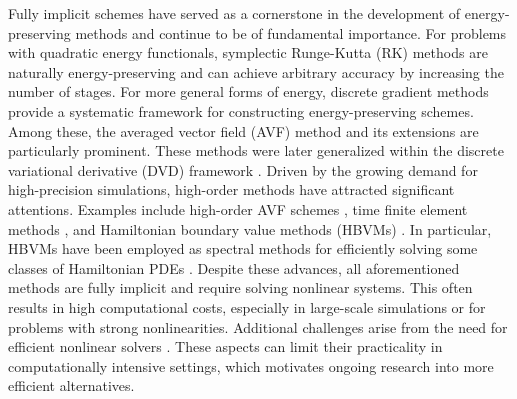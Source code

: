 \documentclass[onefignum,onetabnum]{siamart}
\begin{document}
Fully implicit schemes have served as a cornerstone in the development of energy-preserving methods and continue to be of fundamental importance. For problems with quadratic energy functionals, symplectic Runge-Kutta (RK) methods \cite{hairer-06-GNI-ODE} are naturally energy-preserving and can achieve arbitrary accuracy by increasing the number of stages. For more general forms of energy, discrete gradient methods \cite{mcLachlan-99-DG-PTRSLA} provide a systematic framework for constructing energy-preserving schemes. Among these, the averaged vector field (AVF) method \cite{quispel-08-AVF-JPAMT} and its extensions \cite{cai-18-PAVF-JCP,wu-13-oscil-JCP} are particularly prominent. These methods were later generalized within the discrete variational derivative (DVD) framework \cite{furihata-11-DVD-CHCRC}. Driven by the growing demand for high-precision simulations, high-order methods have attracted significant attentions. Examples include high-order AVF schemes \cite{hairer-10-coll-JNAIAM,Li-16-AVF-JCM}, time finite element methods \cite{betsch-00-time-FEM-JCP,tang-12-time-FEM-AMC}, and Hamiltonian boundary value methods (HBVMs) \cite{luigi-19-HBVM-KDV-JCAM,luigi-10-HBVM-JNAIAM,luigi-20-gyrocenter-HBVM-JCAM}. In particular, HBVMs have been employed as spectral methods for efficiently solving some classes of Hamiltonian PDEs \cite{luigi-19-spectral-space-time-HPDEs-NA}. Despite these advances, all aforementioned methods are fully implicit and require solving nonlinear systems. This often results in high computational costs, especially in large-scale simulations or for problems with strong nonlinearities. Additional challenges arise from the need for efficient nonlinear solvers \cite{luigi-11-efficient-HBVM-JCAM}. These aspects can limit their practicality in computationally intensive settings, which motivates ongoing research into more efficient alternatives.
\end{document}
